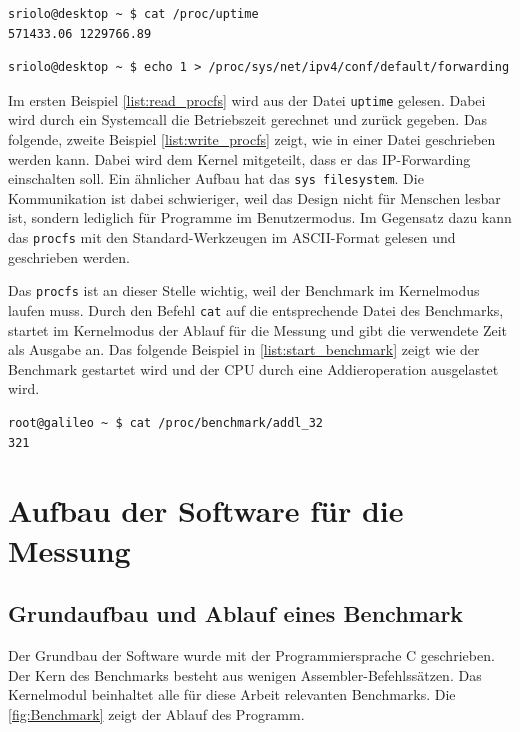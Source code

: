 \lstset{language=bash}
\begin{lstlisting}[label={list:read_procfs},caption={Lesen im procfs}]
sriolo@desktop ~ $ cat /proc/uptime 
571433.06 1229766.89
\end{lstlisting}
\begin{lstlisting}[label={list:write_procfs},caption={Schreiben im procfs}]
sriolo@desktop ~ $ echo 1 > /proc/sys/net/ipv4/conf/default/forwarding
\end{lstlisting}

Im ersten Beispiel \autoref{list:read_procfs} wird aus der Datei \texttt{uptime} gelesen. Dabei wird durch ein Systemcall die Betriebszeit gerechnet und zurück gegeben. Das folgende, zweite Beispiel \autoref{list:write_procfs} zeigt, wie in einer Datei geschrieben werden kann. Dabei wird dem Kernel mitgeteilt, dass er das IP-Forwarding einschalten soll. Ein ähnlicher Aufbau hat das \texttt{sys filesystem}. Die Kommunikation ist dabei schwieriger, weil das Design nicht für Menschen lesbar ist, sondern lediglich für Programme im Benutzermodus. Im Gegensatz dazu kann das \texttt{procfs} mit den Standard-Werkzeugen im ASCII-Format gelesen und geschrieben werden.
\par
Das \texttt{procfs} ist an dieser Stelle wichtig, weil der Benchmark im Kernelmodus laufen muss. Durch den Befehl \texttt{cat} auf die entsprechende Datei des Benchmarks, startet im Kernelmodus der Ablauf für die Messung und gibt die verwendete Zeit als Ausgabe an. Das folgende Beispiel in \autoref{list:start_benchmark} zeigt wie der Benchmark gestartet wird und der CPU durch eine Addieroperation ausgelastet wird.

\begin{lstlisting}[label={list:start_benchmark},caption={Starten des Benchmark}]
root@galileo ~ $ cat /proc/benchmark/addl_32
321
\end{lstlisting}


\section{Aufbau der Software für die Messung}


\subsection{Grundaufbau und Ablauf eines Benchmark}
Der Grundbau der Software wurde mit der Programmiersprache C geschrieben. Der Kern des Benchmarks besteht aus wenigen Assembler-Befehlssätzen. Das Kernelmodul beinhaltet alle für diese Arbeit relevanten Benchmarks. Die \autoref{fig:Benchmark} zeigt der Ablauf des Programm.

